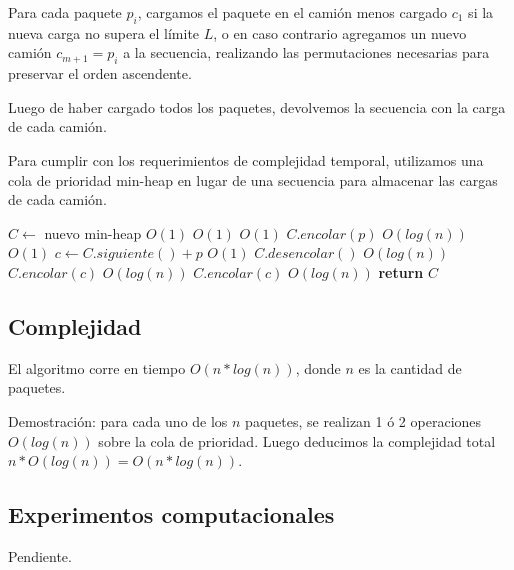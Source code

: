 \documentclass[a4paper,10pt,twoside]{article}
\newenvironment{pseudo}[1][]{%
    \vspace{0.5em}%
    \begin{algorithmic}%
}
{%
    \end{algorithmic}%
    \vspace{0.5em}%
}
\newcommand{\In}{\textbf{in} }
\newcommand{\Ode}[1]{\hfill $O(#1)$}
\begin{document}
Para cada paquete $p_i$, cargamos el paquete en el camión menos cargado $c_1$ si la nueva carga no supera el límite $L$, o en caso contrario agregamos un nuevo camión $c_{m+1} = p_i$ a la secuencia, realizando las permutaciones necesarias para preservar el orden ascendente.

Luego de haber cargado todos los paquetes, devolvemos la secuencia con la carga de cada camión.

Para cumplir con los requerimientos de complejidad temporal, utilizamos una cola de prioridad min-heap en lugar de una secuencia para almacenar las cargas de cada camión.

\begin{pseudo}
        \State $C \leftarrow$ nuevo min-heap                    \Ode{1}
        \ForAll{$p$ \In $\langle p_1, \ldots, p_n \rangle$}     \Ode{1}
                                     \Ode{1}
                \State $C.encolar(p)$                           \Ode{log(n)}
                              \Ode{1}
                \State $c \leftarrow C.siguiente() + p$         \Ode{1}
                \State $C.desencolar()$                         \Ode{log(n)}
                \State $C.encolar(c)$                           \Ode{log(n)}
            \Else
                \State $C.encolar(c)$                           \Ode{log(n)}
            \EndIf
        \EndFor
        \State \textbf{return} $C$
    \EndProcedure
\end{pseudo}


\subsection{Complejidad}

El algoritmo corre en tiempo $O(n*log(n))$, donde $n$ es la cantidad de paquetes.

Demostración: para cada uno de los $n$ paquetes, se realizan 1 ó 2 operaciones $O(log(n))$ sobre la cola de prioridad. Luego deducimos la complejidad total $n * O(log(n)) = O(n * log(n))$.


\subsection{Experimentos computacionales}

Pendiente.


\end{document}
